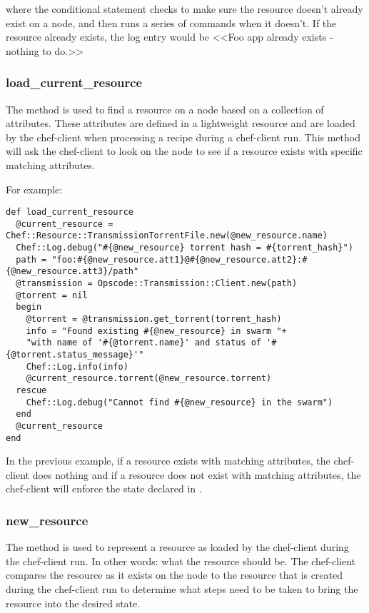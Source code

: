 where the  conditional statement checks to make sure the resource doesn't already exist on a node, and then runs a series of commands when it doesn't. If the resource already exists, the log entry would be <<Foo app already exists - nothing to do.>>

\subsubsection{load\_current\_resource}

The  method is used to find a resource on a node based on a collection of attributes. These attributes are defined in a lightweight resource and are loaded by the chef-client when processing a recipe during a chef-client run. This method will ask the chef-client to look on the node to see if a resource exists with specific matching attributes.

For example:

\begin{lstlisting}[label=lst:cookbook-lwrp-dsl-load-current-resource]
def load_current_resource
  @current_resource = Chef::Resource::TransmissionTorrentFile.new(@new_resource.name)
  Chef::Log.debug("#{@new_resource} torrent hash = #{torrent_hash}")
  path = "foo:#{@new_resource.att1}@#{@new_resource.att2}:#{@new_resource.att3}/path"
  @transmission = Opscode::Transmission::Client.new(path)
  @torrent = nil
  begin
    @torrent = @transmission.get_torrent(torrent_hash)
    info = "Found existing #{@new_resource} in swarm "+
    "with name of '#{@torrent.name}' and status of '#{@torrent.status_message}'"
    Chef::Log.info(info)
    @current_resource.torrent(@new_resource.torrent)
  rescue
    Chef::Log.debug("Cannot find #{@new_resource} in the swarm")
  end
  @current_resource
end
\end{lstlisting}

In the previous example, if a resource exists with matching attributes, the chef-client does nothing and if a resource does not exist with matching attributes, the chef-client will enforce the state declared in .

\subsubsection{new\_resource}

The  method is used to represent a resource as loaded by the chef-client during the chef-client run. In other words: what the resource should be. The chef-client compares the resource as it exists on the node to the resource that is created during the chef-client run to determine what steps need to be taken to bring the resource into the desired state.

